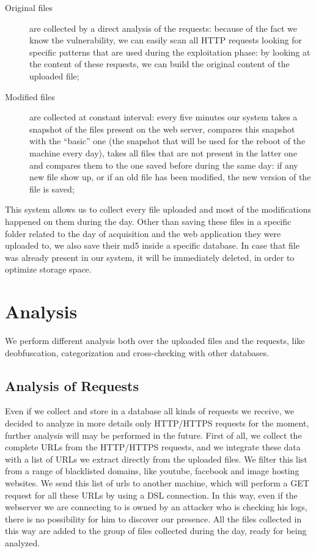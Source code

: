 \begin{description}
\item[Original files] are collected by a direct analysis of the requests: because of the fact we know the vulnerability, we can easily scan all HTTP requests looking for specific patterns that are used during the exploitation phase: by looking at the content of these requests, we can build the original content of the uploaded file;
\item[Modified files] are collected at constant interval: every five minutes our system takes a snapshot of the files present on the web server, compares this snapshot with the ``basic'' one (the snapshot that will be used for the reboot of the machine every day), takes all files that are not present in the latter one and compares them to the one saved before during the same day: if any new file show up, or if an old file has been modified, the new version of the file is saved;
\end{description}

This system allows us to collect every file uploaded and most of the modifications happened on them during the day.
Other than saving these files in a specific folder related to the day of acquisition and the web application they were uploaded to, we also save their md5 inside a specific database. In case that file was already present in our system, it will be immediately deleted, in order to optimize storage space.

\section{Analysis}

We perform different analysis both over the uploaded files and the requests, like deobfuscation, categorization and cross-checking with other databases.

\subsection{Analysis of Requests}

Even if we collect and store in a database all kinds of requests we receive, we decided to analyze in more details only HTTP/HTTPS requests for the moment, further analysis will may be performed in the future.
First of all, we collect the complete URLs from the HTTP/HTTPS requests, and we integrate these data with a list of URLs we extract directly from the uploaded files. We filter this list from a range of blacklisted domains, like youtube, facebook and image hosting websites. We send this list of urls to another machine, which will perform a GET request for all these URLs by using a DSL connection. In this way, even if the webserver we are connecting to is owned by an attacker who is checking his logs, there is no possibility for him to discover our presence. All the files collected in this way are added to the group of files collected during the day, ready for being analyzed.

